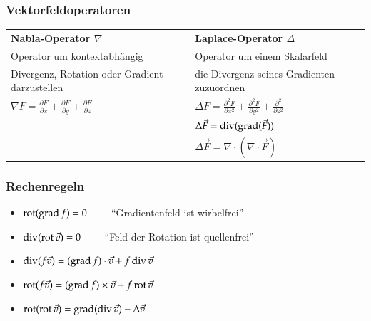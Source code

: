 \subsubsection{Vektorfeldoperatoren }
\begin{tabular}{ll}
	\textbf{Nabla-Operator $\nabla$} & \textbf{Laplace-Operator $\Delta$}\\
	Operator um kontextabhängig & Operator um einem Skalarfeld\\
	Divergenz, Rotation oder Gradient darzustellen  &  die Divergenz seines Gradienten zuzuordnen\\
	$\nabla F=\frac{\partial F}{\partial x}+\frac{\partial F}{\partial y}+\frac{\partial F}{\partial z}$&$\Delta F=\frac{\partial^{2}F}{\partial x^{2}}+\frac{\partial^{2}F}{\partial y^{2}}+\frac{\partial^{2}}{\partial z^{2}}$\\
	&$\Delta \vec{F} = \operatorname{div}(\operatorname{grad}(\vec{F}))$\\
	&$\Delta \vec{F} = \nabla \cdot (\nabla \cdot \vec{F})$\\	 
\end{tabular}
\subsubsection{Rechenregeln }
\begin{itemize}
	\item $\operatorname{rot}(\operatorname{grad} f) = 0 \qquad $ ``Gradientenfeld ist wirbelfrei''
	\item $\operatorname{div}(\operatorname{rot} \vec{v}) = 0 \qquad $ ``Feld der Rotation ist quellenfrei''
	\item $\operatorname{div}(f\vec{v}) = (\operatorname{grad} f) \cdot \vec{v} + f \operatorname{div} \vec{v}$
	\item $\operatorname{rot}(f\vec{v}) = (\operatorname{grad} f) \times \vec{v} + f \operatorname{rot} \vec{v}$
	\item $\operatorname{rot}(\operatorname{rot} \vec{v}) = \operatorname{grad}(\operatorname{div} \vec{v}) - \Delta \vec{v}$
\end{itemize}
